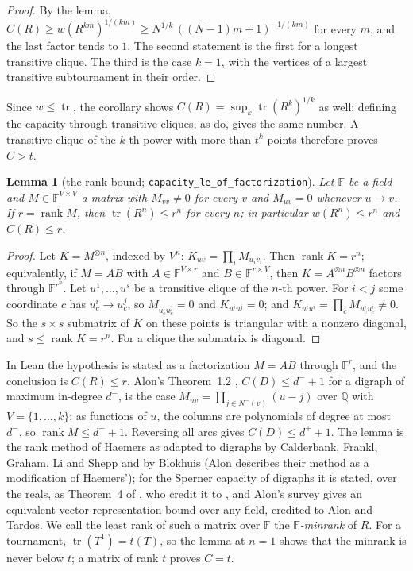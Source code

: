 \documentclass[11pt]{article}
\newtheorem{lemma}[theorem]{Lemma}
\theoremstyle{definition}
\theoremstyle{remark}
\newcommand{\F}{\mathbb{F}}
\newcommand{\Q}{\mathbb{Q}}
\newcommand{\tr}{\operatorname{tr}}
\newcommand{\rk}{\operatorname{rank}}
\begin{document}
\begin{proof}
By the lemma,
$C(R) \ge w(R^{km})^{1/(km)} \ge N^{1/k} \, ((N-1)m+1)^{-1/(km)}$ for every $m$, and the last
factor tends to $1$. The second statement is the first for a longest transitive clique. The third
is the case $k = 1$, with the vertices of a largest transitive subtournament in their order.
\end{proof}

Since $w \le \tr$, the corollary shows $C(R) = \sup_k \tr(R^k)^{1/k}$ as well: defining the capacity
through transitive cliques, as \cite{kov} do, gives the same number. A transitive clique of the
$k$-th power with more than $t^k$ points therefore proves $C > t$.

\begin{lemma}[the rank bound; \texttt{capacity\_le\_of\_factorization}]\label{lem:rank}
Let $\F$ be a field and $M \in \F^{V \times V}$ a matrix with $M_{vv} \ne 0$ for every $v$ and
$M_{uv} = 0$ whenever $u \to v$. If $r = \rk M$, then $\tr(R^n) \le r^n$ for every $n$; in
particular $w(R^n) \le r^n$ and $C(R) \le r$.
\end{lemma}

\begin{proof}
Let $K = M^{\otimes n}$, indexed by $V^n$: $K_{uv} = \prod_i M_{u_i v_i}$. Then
$\rk K = r^n$; equivalently, if $M = AB$ with $A \in \F^{V \times r}$ and $B \in \F^{r \times V}$,
then $K = A^{\otimes n} B^{\otimes n}$ factors through $\F^{r^n}$. Let $u^1, \dots, u^s$ be a
transitive clique of the $n$-th power. For $i < j$ some coordinate $c$ has $u^i_c \to u^j_c$, so
$M_{u^i_c u^j_c} = 0$ and $K_{u^i u^j} = 0$; and $K_{u^i u^i} = \prod_c M_{u^i_c u^i_c} \ne 0$. So
the $s \times s$ submatrix of $K$ on these points is triangular with a nonzero diagonal, and
$s \le \rk K = r^n$. For a clique the submatrix is diagonal.
\end{proof}

In Lean the hypothesis is stated as a factorization $M = AB$ through $\F^r$, and the conclusion is
$C(R) \le r$. Alon's Theorem~1.2 \cite{alon}, $C(D) \le d^- + 1$ for a digraph of maximum in-degree
$d^-$, is the case $M_{uv} = \prod_{j \in N^-(v)} (u - j)$ over $\Q$ with $V = \{1, \dots, k\}$: as
functions of $u$, the columns are polynomials of degree at most $d^-$, so $\rk M \le d^- + 1$.
Reversing all arcs gives $C(D) \le d^+ + 1$. The lemma is the rank method of Haemers \cite{haemers} as adapted to digraphs by Calderbank,
Frankl, Graham, Li and Shepp \cite{cfgls} and by Blokhuis \cite{blokhuis} (Alon \cite{alon} describes
their method as a modification of Haemers'); for the Sperner capacity of digraphs it is stated, over the
reals, as Theorem~4 of \cite{kov}, who credit it to \cite{cfgls}, and Alon's survey \cite{alonsurvey}
gives an equivalent vector-representation bound over any field, credited to Alon and Tardos. We call the least rank of such a matrix over $\F$ the \emph{$\F$-minrank} of $R$.
For a tournament, $\tr(T^1) = t(T)$, so the lemma at $n = 1$ shows that the minrank is never below
$t$; a matrix of rank $t$ proves $C = t$.
\end{document}
